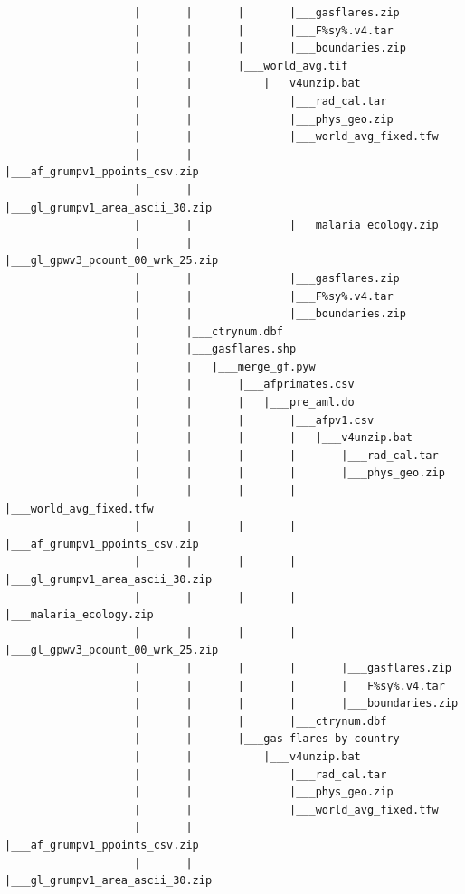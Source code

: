 \documentclass[]{book}
\begin{document}
\begin{verbatim}
                    |       |       |       |___gasflares.zip
                    |       |       |       |___F%sy%.v4.tar
                    |       |       |       |___boundaries.zip
                    |       |       |___world_avg.tif
                    |       |           |___v4unzip.bat
                    |       |               |___rad_cal.tar
                    |       |               |___phys_geo.zip
                    |       |               |___world_avg_fixed.tfw
                    |       |               |___af_grumpv1_ppoints_csv.zip
                    |       |               |___gl_grumpv1_area_ascii_30.zip
                    |       |               |___malaria_ecology.zip
                    |       |               |___gl_gpwv3_pcount_00_wrk_25.zip
                    |       |               |___gasflares.zip
                    |       |               |___F%sy%.v4.tar
                    |       |               |___boundaries.zip
                    |       |___ctrynum.dbf
                    |       |___gasflares.shp
                    |       |   |___merge_gf.pyw
                    |       |       |___afprimates.csv
                    |       |       |   |___pre_aml.do
                    |       |       |       |___afpv1.csv
                    |       |       |       |   |___v4unzip.bat
                    |       |       |       |       |___rad_cal.tar
                    |       |       |       |       |___phys_geo.zip
                    |       |       |       |       |___world_avg_fixed.tfw
                    |       |       |       |       |___af_grumpv1_ppoints_csv.zip
                    |       |       |       |       |___gl_grumpv1_area_ascii_30.zip
                    |       |       |       |       |___malaria_ecology.zip
                    |       |       |       |       |___gl_gpwv3_pcount_00_wrk_25.zip
                    |       |       |       |       |___gasflares.zip
                    |       |       |       |       |___F%sy%.v4.tar
                    |       |       |       |       |___boundaries.zip
                    |       |       |       |___ctrynum.dbf
                    |       |       |___gas flares by country
                    |       |           |___v4unzip.bat
                    |       |               |___rad_cal.tar
                    |       |               |___phys_geo.zip
                    |       |               |___world_avg_fixed.tfw
                    |       |               |___af_grumpv1_ppoints_csv.zip
                    |       |               |___gl_grumpv1_area_ascii_30.zip

\end{verbatim}
\end{document}
